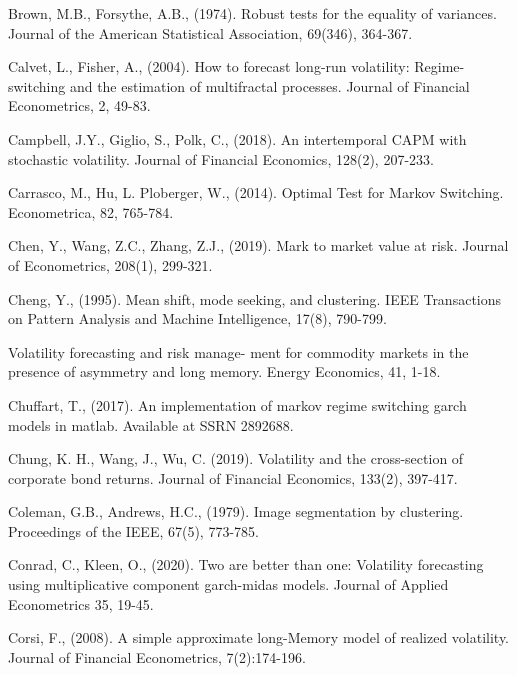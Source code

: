 \documentclass[preprint,12pt,authoryear]{elsarticle}
\begin{document}
\begin{thebibliography}{00}
Brown, M.B., Forsythe, A.B., (1974). Robust tests for the equality of variances. Journal of the American Statistical Association, 69(346), 364-367.

Calvet, L., Fisher, A., (2004). How to forecast long-run volatility: Regime-switching and
the estimation of multifractal processes. Journal of Financial Econometrics, 2, 49-83.

Campbell, J.Y., Giglio, S., Polk, C., (2018). An intertemporal CAPM with stochastic volatility. Journal of Financial Economics, 128(2), 207-233.

Carrasco, M., Hu, L. Ploberger, W., (2014). Optimal Test for Markov Switching. Econometrica, 82, 765-784.

 Chen, Y., Wang, Z.C., Zhang, Z.J., (2019). Mark to market value at risk. Journal of Econometrics, 208(1), 299-321.

 Cheng, Y., (1995). Mean shift, mode seeking, and clustering. IEEE Transactions on Pattern Analysis and Machine Intelligence, 17(8), 790-799.

 Volatility forecasting and risk manage-
ment for commodity markets in the presence of asymmetry and long memory. Energy
Economics, 41, 1-18.

Chuffart, T., (2017). An implementation of markov regime switching garch models in matlab. Available at SSRN 2892688.

 Chung, K. H., Wang, J., Wu, C. (2019). Volatility and the cross-section of corporate bond returns. Journal of Financial Economics, 133(2), 397-417.

 Coleman, G.B., Andrews, H.C., (1979). Image segmentation by clustering. Proceedings of the IEEE, 67(5), 773-785.

 Conrad, C., Kleen, O., (2020). Two are better than one: Volatility forecasting using
multiplicative component garch-midas models. Journal of Applied Econometrics 35,
19-45.

Corsi, F., (2008). A simple approximate long-Memory model of realized volatility. Journal of Financial Econometrics,  7(2):174-196.


\end{thebibliography}
\end{document}

